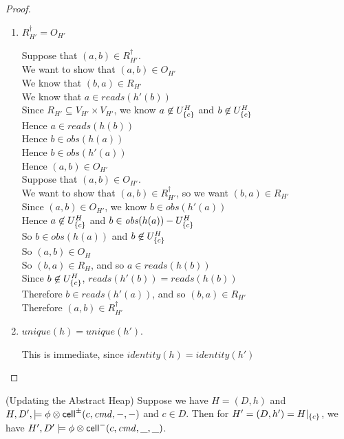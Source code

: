 \begin{proof}
\begin{enumerate}
\item $R^\dagger_{H'} = O_{H'}$ 
  \begin{tabbedproof}
    \oo Suppose that $(a, b) \in R^\dagger_{H'}$. \\
    \ooo We want to show that $(a, b) \in O_{H'}$ \\
    \ooo We know that $(b, a) \in R_{H'}$ \\
    \ooo We know that $a \in \mathit{reads}(h'(b))$ \\
    \ooo Since $R_{H'} \subseteq V_{H'} \times V_{H'}$, we know $a \not\in U^H_{\{{c}\}}$ and $b \not \in U^H_{\{{c}\}}$ \\
    \ooo Hence $a \in \mathit{reads}(h(b))$ \\ 
    \ooo Hence $b \in \mathit{obs}(h(a))$ \\
    \ooo Hence $b \in \mathit{obs}(h'(a))$ \\
    \ooo Hence $(a,b) \in O_{H'}$ \\
    \oo Suppose that $(a, b) \in O_{H'}$. \\
    \ooo We want to show that $(a,b) \in R^\dagger_{H'}$, so we want $(b,a) \in R_{H'}$ \\
    \ooo Since $(a,b) \in O_{H'}$, we know $b \in \mathit{obs}(h'(a))$ \\
    \ooo Hence $a \not\in U^H_{\{{c}\}}$ and $b \in \mathit{obs}(h(a)) - U^H_{\{{c}\}}$ \\
    \ooo So $b \in \mathit{obs}(h(a))$ and $b \not \in U^H_{\{{c}\}}$ \\
    \ooo So $(a,b) \in O_H$ \\
    \ooo So $(b,a) \in R_H$, and so $a \in \mathit{reads}(h(b))$ \\
    \ooo Since $b \not\in U^H_{\{{c}\}}$, $\mathit{reads}(h'(b)) = \mathit{reads}(h(b))$ \\
    \ooo Therefore $b \in \mathit{reads}(h'(a))$, and so $(b,a) \in R_{H'}$ \\
    \ooo Therefore $(a,b) \in R^\dagger_{H'}$ 
  \end{tabbedproof}

\item $\mathit{unique}(h) = \mathit{unique}(h')$.

This is immediate, since $\mathit{identity}(h) = \mathit{identity}(h')$ 
\end{enumerate}
\end{proof}


\begin{lemma}{(Updating the Abstract Heap)}
Suppose we have $H = (D,h)$ and $H, D', \models \phi \otimes
\mathsf{cell}^{\pm}({c}, {\mathit{cmd}}, {-}, {-})$ and $c \in D$. Then for $H' = (D, h') = H|_{\{{c}\}}$, we
have $H', D' \models \phi \otimes \mathsf{cell}^{-}({c}, {\mathit{cmd}}, {\_}, {\_})$.
\end{lemma}

